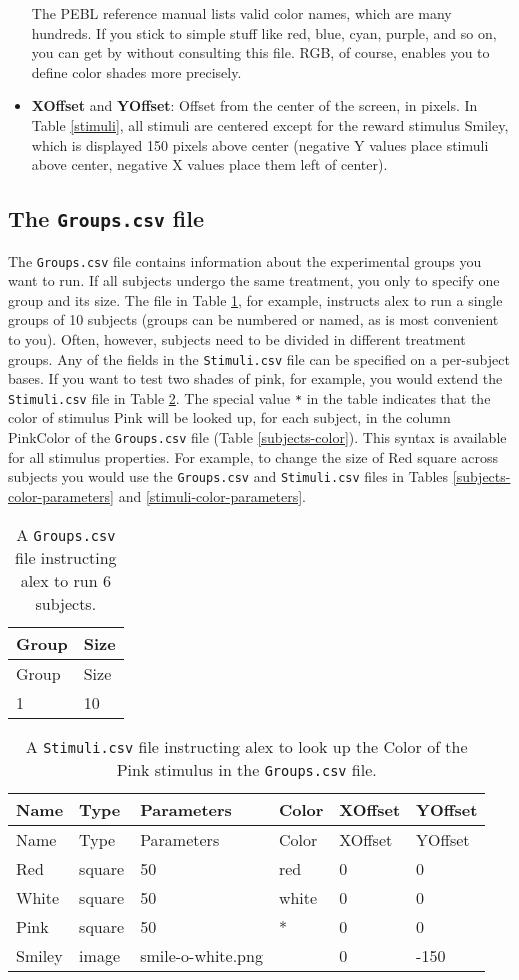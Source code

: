 \documentclass[11pt,]{article}
\begin{document}
\begin{itemize}
  The PEBL reference manual lists valid color names, which are many
  hundreds. If you stick to simple stuff like red, blue, cyan, purple,
  and so on, you can get by without consulting this file. RGB, of
  course, enables you to define color shades more precisely.
\item
  \textbf{XOffset} and \textbf{YOffset}: Offset from the center of the
  screen, in pixels. In Table \ref{stimuli}, all stimuli are centered
  except for the reward stimulus Smiley, which is displayed 150 pixels
  above center (negative Y values place stimuli above center, negative X
  values place them left of center).
\end{itemize}

\subsection{The \texttt{Groups.csv} file}\label{the-groups.csv-file}

The \texttt{Groups.csv} file contains information about the experimental
groups you want to run. If all subjects undergo the same treatment, you
only to specify one group and its size. The file in Table
\ref{subjects}, for example, instructs alex to run a single groups of 10
subjects (groups can be numbered or named, as is most convenient to
you). Often, however, subjects need to be divided in different treatment
groups. Any of the fields in the \texttt{Stimuli.csv} file can be
specified on a per-subject bases. If you want to test two shades of
pink, for example, you would extend the \texttt{Stimuli.csv} file in
Table \ref{stimuli-color}. The special value \texttt{*} in the table
indicates that the color of stimulus Pink will be looked up, for each
subject, in the column PinkColor of the \texttt{Groups.csv} file (Table
\ref{subjects-color}). This syntax is available for all stimulus
properties. For example, to change the size of Red square across
subjects you would use the \texttt{Groups.csv} and \texttt{Stimuli.csv}
files in Tables \ref{subjects-color-parameters} and
\ref{stimuli-color-parameters}.

\begin{longtable}[c]{@{}ll@{}}
\caption{A \texttt{Groups.csv} file instructing alex to run 6 subjects.
\label{subjects}}\tabularnewline
\toprule
Group & Size\tabularnewline
\midrule
\endfirsthead
\toprule
Group & Size\tabularnewline
\midrule
\endhead
1 & 10\tabularnewline
\bottomrule
\end{longtable}

\begin{longtable}[c]{@{}llllll@{}}
\caption{A \texttt{Stimuli.csv} file instructing alex to look up the
Color of the Pink stimulus in the \texttt{Groups.csv} file.
\label{stimuli-color}}\tabularnewline
\toprule
Name & Type & Parameters & Color & XOffset & YOffset\tabularnewline
\midrule
\endfirsthead
\toprule
Name & Type & Parameters & Color & XOffset & YOffset\tabularnewline
\midrule
\endhead
Red & square & 50 & red & 0 & 0\tabularnewline
White & square & 50 & white & 0 & 0\tabularnewline
Pink & square & 50 & * & 0 & 0\tabularnewline
Smiley & image & smile-o-white.png & & 0 & -150\tabularnewline
\bottomrule
\end{longtable}
\end{document}
